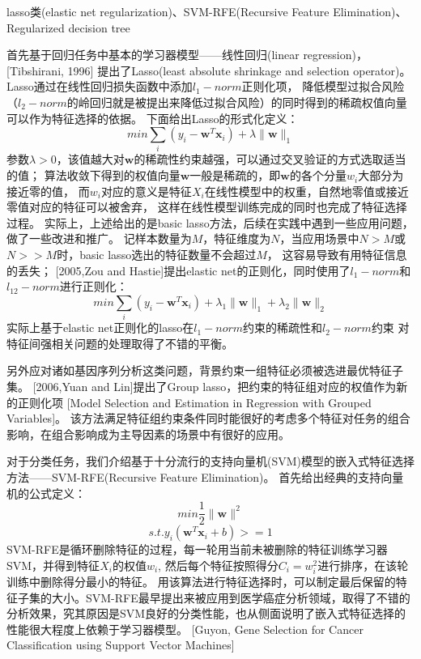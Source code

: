 \documentclass[a4paper,UTF8]{article}
\begin{document}
lasso类(elastic net regularization)、SVM-RFE(Recursive Feature Elimination)、Regularized decision tree

首先基于回归任务中基本的学习器模型——线性回归(linear regression)，[Tibshirani, 1996]
提出了Lasso(least absolute shrinkage and selection operator)。
Lasso通过在线性回归损失函数中添加$l_{1}-norm$正则化项，
降低模型过拟合风险（$l_{2}-norm$的岭回归就是被提出来降低过拟合风险）的同时得到的稀疏权值向量可以作为特征选择的依据。
下面给出Lasso的形式化定义：
$$ min \sum_{i}(y_{i}-\textbf{w}^{T}\textbf{x}_{i})+\lambda \parallel \textbf{w} \parallel _{1} $$
参数$\lambda>0$，该值越大对$\textbf{w}$的稀疏性约束越强，可以通过交叉验证的方式选取适当的值；
算法收敛下得到的权值向量$\textbf{w}$一般是稀疏的，即$\textbf{w}$的各个分量$w_{i}$大部分为接近零的值，
而$w_{i}$对应的意义是特征$X_{i}$在线性模型中的权重，自然地零值或接近零值对应的特征可以被舍弃，
这样在线性模型训练完成的同时也完成了特征选择过程。
实际上，上述给出的是basic lasso方法，后续在实践中遇到一些应用问题，做了一些改进和推广。
记样本数量为$M$，特征维度为$N$，当应用场景中$N>M$或$N>>M$时，basic lasso选出的特征数量不会超过$M$，
这容易导致有用特征信息的丢失；
[2005,Zou and Hastie]提出elastic net的正则化，同时使用了$l_{1}-norm$和$l_{12}-norm$进行正则化：
$$ min \sum_{i}(y_{i}-\textbf{w}^{T}\textbf{x}_{i})+
\lambda_{1} \parallel \textbf{w} \parallel _{1} +\lambda_{2} \parallel \textbf{w} \parallel _{2} $$
实际上基于elastic net正则化的lasso在$l_{1}-norm$约束的稀疏性和$l_{2}-norm$约束
对特征间强相关问题的处理取得了不错的平衡。

另外应对诸如基因序列分析这类问题，背景约束一组特征必须被选进最优特征子集。
[2006,Yuan and Lin]提出了Group lasso，把约束的特征组对应的权值作为新的正则化项
[Model Selection and Estimation in Regression with Grouped Variables]。
该方法满足特征组约束条件同时能很好的考虑多个特征对任务的组合影响，在组合影响成为主导因素的场景中有很好的应用。


对于分类任务，我们介绍基于十分流行的支持向量机(SVM)模型的嵌入式特征选择方法——SVM-RFE(Recursive Feature Elimination)。
首先给出经典的支持向量机的公式定义：
$$ min \frac{1}{2}\parallel \textbf{w} \parallel^{2} $$
$$ s.t. y_{i}(\textbf{w}^{T}\textbf{x}_{i}+b)>=1 $$
SVM-RFE是循环删除特征的过程，每一轮用当前未被删除的特征训练学习器SVM，并得到特征$X_{i}$的权值$w_{i}$,
然后每个特征按照得分$C_{i}=w_{i}^{2}$进行排序，在该轮训练中删除得分最小的特征。
用该算法进行特征选择时，可以制定最后保留的特征子集的大小。SVM-RFE最早提出来被应用到医学癌症分析领域，取得了不错的
分析效果，究其原因是SVM良好的分类性能，也从侧面说明了嵌入式特征选择的性能很大程度上依赖于学习器模型。
[Guyon, Gene Selection for Cancer Classification using Support Vector Machines]
\end{document}
